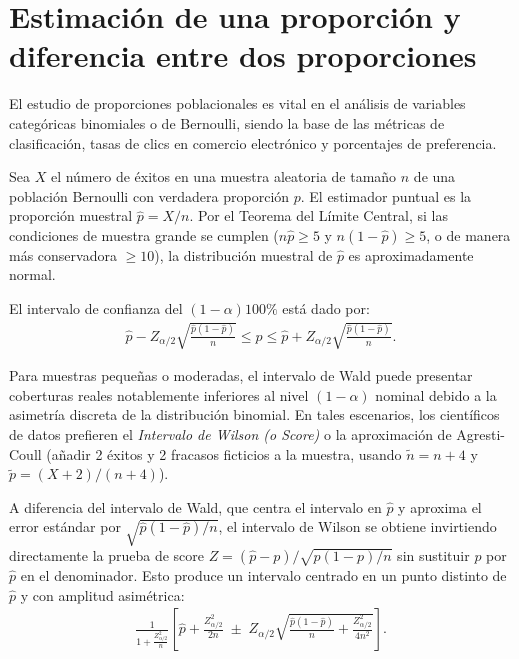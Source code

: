 \section{Estimación de una proporción y diferencia entre dos proporciones}

El estudio de proporciones poblacionales es vital en el análisis de variables categóricas binomiales o de Bernoulli, siendo la base de las métricas de clasificación, tasas de clics en comercio electrónico y porcentajes de preferencia.

\begin{teorema}
	Sea $X$ el número de éxitos en una muestra aleatoria de tamaño $n$ de una población Bernoulli con verdadera proporción $p$. El estimador puntual es la proporción muestral $\hat{p} = X/n$. Por el Teorema del Límite Central, si las condiciones de muestra grande se cumplen ($n\hat{p} \geq 5$ y $n(1-\hat{p}) \geq 5$, o de manera más conservadora $\geq 10$), la distribución muestral de $\hat{p}$ es aproximadamente normal.

	El intervalo de confianza del $(1-\alpha)100\%$ está dado por:
	\begin{align}
		\hat{p} - Z_{\alpha/2} \sqrt{\frac{\hat{p}(1-\hat{p})}{n}} \leq p \leq \hat{p} + Z_{\alpha/2} \sqrt{\frac{\hat{p}(1-\hat{p})}{n}}.
	\end{align}
\end{teorema}

\begin{observacion}
	Para muestras pequeñas o moderadas, el intervalo de Wald puede presentar coberturas reales notablemente inferiores al nivel $(1-\alpha)$ nominal debido a la asimetría discreta de la distribución binomial. En tales escenarios, los científicos de datos prefieren el \emph{Intervalo de Wilson (o Score)} o la aproximación de Agresti-Coull (añadir 2 éxitos y 2 fracasos ficticios a la muestra, usando $\tilde{n} = n + 4$ y $\tilde{p} = (X+2)/(n+4)$).
\end{observacion}

\begin{teorema}
	A diferencia del intervalo de Wald, que centra el intervalo en $\hat{p}$ y aproxima el error estándar por $\sqrt{\hat p(1-\hat p)/n}$, el intervalo de Wilson se obtiene invirtiendo directamente la prueba de score $Z = (\hat{p}-p)/\sqrt{p(1-p)/n}$ sin sustituir $p$ por $\hat{p}$ en el denominador. Esto produce un intervalo centrado en un punto distinto de $\hat p$ y con amplitud asimétrica:
	\begin{align}
		\frac{1}{1+\frac{Z_{\alpha/2}^2}{n}}\left[\hat{p} + \frac{Z_{\alpha/2}^2}{2n} \;\pm\; Z_{\alpha/2}\sqrt{\frac{\hat{p}(1-\hat{p})}{n} + \frac{Z_{\alpha/2}^2}{4n^2}}\right].
	\end{align}
\end{teorema}

